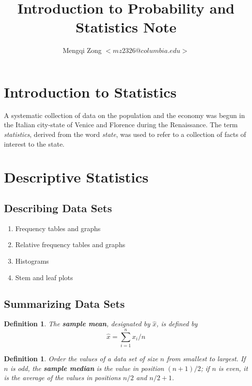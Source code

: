 \documentclass[12pt]{article}
\title{Introduction to Probability and Statistics Note}
\author{Mengqi Zong $<mz2326@columbia.edu>$}
\newtheorem{definition}[theorem]{Definition}
\begin{document}
\maketitle

\tableofcontents

\setlength{\parindent}{0in}

\section{Introduction to Statistics}

A systematic collection of data on the population and the economy was begun in the Italian city-state of Venice and Florence during the Renaissance. The term \emph{statistics}, derived from the word \emph{state}, was used to refer to a collection of facts of interest to the state.

\section{Descriptive Statistics}

\subsection{Describing Data Sets}
\begin{enumerate}
  \item Frequency tables and graphs
  \item Relative frequency tables and graphs
  \item Histograms
  \item Stem and leaf plots
\end{enumerate}

\subsection{Summarizing Data Sets}

\begin{definition}
  The \textbf{sample mean}, designated by $\hat{x}$, is defined by
  \begin{equation*}
    \hat{x} = \sum_{i=1}^n x_i / n
  \end{equation*}
\end{definition}

\begin{definition}
  Order the values of a data set of size $n$ from smallest to largest. If $n$ is odd, the \textbf{sample median} is the value in position $(n+1)/2$; if $n$ is even, it is the average of the values in positions $n/2$ and $n/2+1$.
\end{definition}
\end{document}
